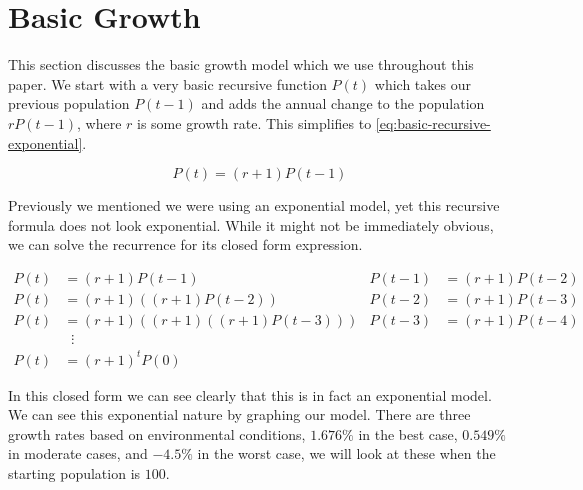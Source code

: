 \documentclass{article}
\begin{document}
\section{Basic Growth}
This section discusses the basic growth model which we use throughout this paper. We start with a very basic recursive function $P(t)$ which takes our previous population $P(t-1)$ and adds the annual change to the population $rP(t-1)$, where $r$ is some growth rate. This simplifies to \autoref{eq:basic-recursive-exponential}.

\begin{equation} \label{eq:basic-recursive-exponential}
    P(t) = (r+1)P(t-1)
\end{equation}

Previously we mentioned we were using an exponential model, yet this recursive formula does not look exponential. While it might not be immediately obvious, we can solve the recurrence for its closed form expression.

\begin{align*}
    P(t) &= (r+1)P(t-1) & P(t-1) &= (r+1)P(t-2) \\
    P(t) &= (r+1)\left((r+1)P(t-2)\right) & P(t-2) &= (r+1)P(t-3) \\
    P(t) &= (r+1)\left((r+1)\left((r+1)P(t-3)\right)\right) & P(t-3) &= (r+1)P(t-4) \\
    &\phantom{x}\vdots \\
    P(t) &= (r+1)^tP(0)
\end{align*}

In this closed form we can see clearly that this is in fact an exponential model. We can see this exponential nature by graphing our model. There are three growth rates based on environmental conditions, $1.676\%$ in the best case, $0.549\%$ in moderate cases, and $-4.5\%$ in the worst case, we will look at these when the starting population is $100$.
\end{document}
